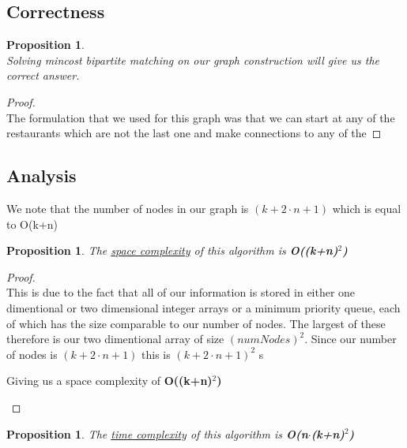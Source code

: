 \documentclass[12pt]{article}
\newtheorem{proposition}[theorem]{Proposition}
\begin{document}

\subsection{Correctness}
\begin{proposition}
~ \\ \indent Solving mincost bipartite matching on our graph construction will give us the correct answer.
\end{proposition}

\begin{proof}
~ \\ \indent The formulation that we used for this graph was that we can start at any of the restaurants
which are not the last one and make connections to any of the
\end{proof}


\subsection{Analysis}
We note that the number of nodes in our graph is $(k + 2\cdot n + 1)$ which is equal to O(k+n)
\begin{proposition}
\label{numq}
The \underline{space complexity} of this algorithm is \textbf{O((k+n)$^2$)}
\end{proposition}

\begin{proof}
~ \\ \indent This is due to the fact that all of our information is stored in either one dimentional or
two dimensional integer arrays or a minimum priority queue, each of which has the size comparable to
our number of nodes. The largest of these therefore is our two dimentional array of size $(numNodes)^2$.
Since our number of nodes is $(k + 2\cdot n + 1)$ this is $(k + 2\cdot n + 1)^2$ s
\begin{center}
    Giving us a space complexity of \textbf{O((k+n)$^2$)}
\end{center}
\end{proof}

\begin{proposition}
\label{numq}
The \underline{time complexity} of this algorithm is \textbf{O(n$\cdot$(k+n)$^2$)}
\end{proposition}
\end{document}
